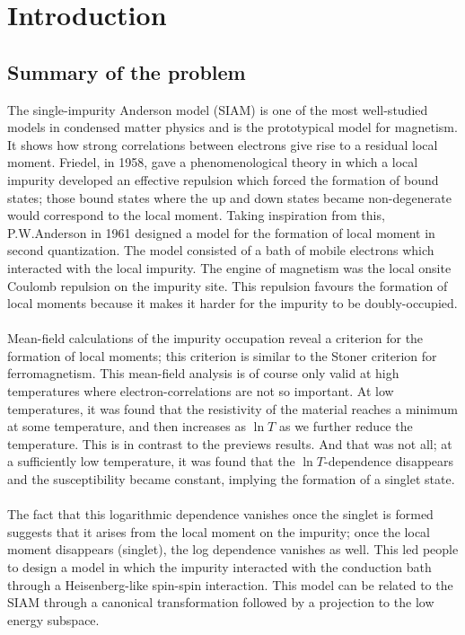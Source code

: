 \documentclass[twoside]{report}
\numberwithin{equation}{section}
\begin{document}
\chapter{Introduction}
\section{Summary of the problem}
The single-impurity Anderson model (SIAM) is one of the most well-studied models in condensed matter physics and is the prototypical model for magnetism.
It shows how strong correlations between electrons give rise to a residual local moment. Friedel\cite{Friedel}, in 1958, gave a phenomenological theory in which a local impurity developed an effective repulsion which forced the formation of bound states; those bound states where the up and down states became non-degenerate would correspond to the local moment.
Taking inspiration from this, P.W.Anderson\cite{Anderson} in 1961 designed a model for the formation of local moment in second quantization.
The model consisted of a bath of mobile electrons which interacted with the local impurity.
The engine of magnetism was the local onsite Coulomb repulsion on the impurity site.
This repulsion favours the formation of local moments because it makes it harder for the impurity to be doubly-occupied.
\\\\ Mean-field calculations of the impurity occupation reveal a criterion for the formation of local moments; this criterion is similar to the Stoner criterion for ferromagnetism. This mean-field analysis is of course only valid at high temperatures where electron-correlations are not so important. At low temperatures, it was found that the resistivity of the material reaches a minimum at some temperature, and then increases as \(\ln T\) as we further reduce the temperature. This is in contrast to the previews results. And that was not all; at a sufficiently low temperature, it was found that the \(\ln T\)-dependence disappears and the susceptibility became constant, implying the formation of a singlet state.
\\\\ The fact that this logarithmic dependence vanishes once the singlet is formed suggests that it arises from the local moment on the impurity; once the local moment disappears (singlet), the log dependence vanishes as well.
This led people to design a model in which the impurity interacted with the conduction bath through a Heisenberg-like spin-spin interaction.
This model can be related to the SIAM through a canonical transformation followed by a projection to the low energy subspace.
\end{document}
